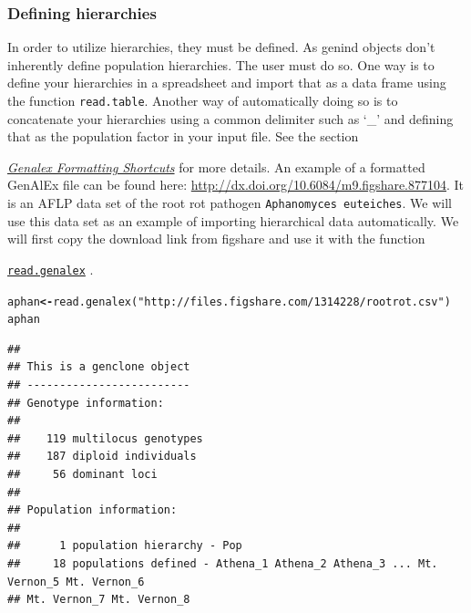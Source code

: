 \documentclass[letterpaper]{article}\usepackage[]{graphicx}\usepackage[]{color}
\makeatletter
\newcommand{\hlstr}[1]{\textcolor[rgb]{0.651,0.522,0}{#1}}%
\newcommand{\hlstd}[1]{\textcolor[rgb]{0,0,0}{#1}}%
\newcommand{\hlkwb}[1]{\textcolor[rgb]{0.502,0.502,0.753}{\textbf{#1}}}%
\newcommand{\hlkwd}[1]{\textcolor[rgb]{0,0.267,0.4}{#1}}%
\newenvironment{kframe}{%
 \def\at@end@of@kframe{}%
 \ifinner\ifhmode%
  \def\at@end@of@kframe{\end{minipage}}%
  \begin{minipage}{\columnwidth}%
 \fi\fi%
 \def\FrameCommand##1{\hskip\@totalleftmargin \hskip-\fboxsep
 \colorbox{shadecolor}{##1}\hskip-\fboxsep
     \hskip-\linewidth \hskip-\@totalleftmargin \hskip\columnwidth}%
 \MakeFramed {\advance\hsize-\width
   \@totalleftmargin\z@ \linewidth\hsize
   \@setminipage}}%
 {\par\unskip\endMakeFramed%
 \at@end@of@kframe}
\newenvironment{knitrout}{}{} %
\newcommand{\tab}{\hspace*{1em}}
\newcommand{\cmdlink}[2]{
  \texttt{\hyperref[#1]{#2}}
}
\newcommand{\seclink}[2]{
  \textit{\hyperref[#1]{#2}}
}
\makeatother
\begin{document}
\subsubsection{Defining hierarchies}\label{data.manip:hier:define}

\tab\tab In order to utilize hierarchies, they must be defined. As genind objects
don't inherently define population hierarchies. The user must do so. One way is
to define your hierarchies in a spreadsheet and import that as a data frame using
the function \texttt{read.table}. Another way of automatically
doing so is to concatenate your hierarchies using a common delimiter such as `\_'
and defining that as the population factor in your input file. See the section 
\seclink{intro:import:genalex.short}{Genalex Formatting Shortcuts} for more
details. An example of a formatted GenAlEx file can be found here: 
\url{http://dx.doi.org/10.6084/m9.figshare.877104}. It is an AFLP data set of the
root rot pathogen \texttt{Aphanomyces euteiches}. We will use this data set as 
an example of importing hierarchical data automatically. We will first copy the 
download link from figshare and use it with the function 
\cmdlink{intro:import:read.genalex}{read.genalex}. 

\begin{knitrout}\footnotesize
{}\color{fgcolor}\begin{kframe}
\begin{alltt}
\hlstd{aphan} \hlkwb{<-} \hlkwd{read.genalex}\hlstd{(}\hlstr{"http://files.figshare.com/1314228/rootrot.csv"}\hlstd{)}
\hlstd{aphan}
\end{alltt}
\end{kframe}
\end{knitrout}

\begin{knitrout}\footnotesize
{}\color{fgcolor}\begin{kframe}
\begin{verbatim}
## 
## This is a genclone object
## -------------------------
## Genotype information:
## 
##    119 multilocus genotypes
##    187 diploid individuals
##     56 dominant loci
## 
## Population information:
## 
##      1 population hierarchy - Pop
##     18 populations defined - Athena_1 Athena_2 Athena_3 ... Mt. Vernon_5 Mt. Vernon_6 
## Mt. Vernon_7 Mt. Vernon_8
\end{verbatim}
\end{kframe}
\end{knitrout}
\end{document}
